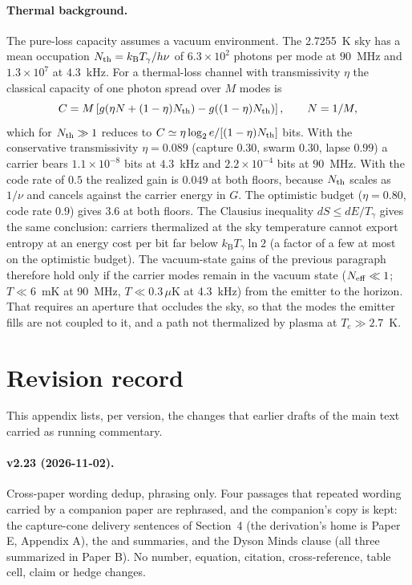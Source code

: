 \documentclass[11pt]{article}
\newcommand{\kb}{\ensuremath{k_{\mathrm{B}}}}
\begin{document}
\paragraph{Thermal background.} The pure-loss capacity assumes a vacuum environment. The 2.7255~K sky has a mean occupation $N_{\rm th} = \kb T_\gamma/h\nu$ of $6.3\times10^{2}$ photons per mode at $90$~MHz and $1.3\times10^{7}$ at $4.3$~kHz. For a thermal-loss channel with transmissivity $\eta$ the classical capacity of one photon spread over $M$ modes \citep{Giovannetti2014} is
\begin{equation}
C = M\left[g\!\left(\eta N + (1-\eta) N_{\rm th}\right) - g\!\left((1-\eta) N_{\rm th}\right)\right], \qquad N = 1/M,
\end{equation}
which for $N_{\rm th} \gg 1$ reduces to $C \simeq \eta \log_2 e/[(1-\eta)N_{\rm th}]$ bits. With the conservative transmissivity $\eta = 0.089$ (capture $0.30$, swarm $0.30$, lapse $0.99$) a carrier bears $1.1\times10^{-8}$ bits at $4.3$~kHz and $2.2\times10^{-4}$ bits at $90$~MHz. With the code rate of $0.5$ the realized gain is $0.049$ at both floors, because $N_{\rm th}$ scales as $1/\nu$ and cancels against the carrier energy in $G$. The optimistic budget ($\eta = 0.80$, code rate $0.9$) gives $3.6$ at both floors. The Clausius inequality $dS \leq dE/T_\gamma$ gives the same conclusion: carriers thermalized at the sky temperature cannot export entropy at an energy cost per bit far below $\kb T_\gamma \ln 2$ (a factor of a few at most on the optimistic budget). The vacuum-state gains of the previous paragraph therefore hold only if the carrier modes remain in the vacuum state ($N_{\rm eff}\ll1$; $T\ll6$~mK at 90~MHz, $T\ll0.3\,\mu$K at 4.3~kHz) from the emitter to the horizon. That requires an aperture that occludes the sky, so that the modes the emitter fills are not coupled to it, and a path not thermalized by plasma at $T_e \gg 2.7$~K.

\section{Revision record}
\label{sec:revrecord}

This appendix lists, per version, the changes that earlier drafts of the main text carried as running commentary.

\paragraph{v2.23 (2026-11-02).} Cross-paper wording dedup, phrasing only. Four passages that repeated wording carried by a companion paper are rephrased, and the companion's copy is kept: the capture-cone delivery sentences of Section~4 (the derivation's home is Paper E, Appendix A), the \citet{Lefebvre2000} and \citet{ReissFeng2026} summaries, and the Dyson Minds clause (all three summarized in Paper B). No number, equation, citation, cross-reference, table cell, claim or hedge changes.
\end{document}
